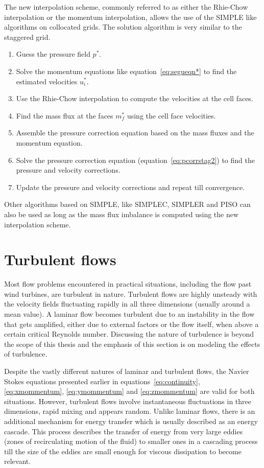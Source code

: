 The new interpolation scheme, commonly referred to as either the Rhie-Chow interpolation or the momentum interpolation, allows the use of the SIMPLE like algorithms on collocated grids. The solution algorithm is very similar to the staggered grid.
\begin{enumerate}
    \item Guess the pressure field $p^{\ast}$.
    \item Solve the momentum equations like equation~\ref{eq:segueqn*} to find the estimated velocities $u_i^{\ast}$.
    \item Use the Rhie-Chow interpolation to compute the velocities at the cell faces.
    \item Find the mass flux at the faces $m_f^{\ast}$ using the cell face velocities.
    \item Assemble the pressure correction equation based on the mass fluxes and the momentum equation.
    \item Solve the pressure correction equation (equation~\ref{eq:pcorrstag2}) to find the pressure and velocity corrections.
    \item Update the pressure and velocity corrections and repeat till convergence.
\end{enumerate}
Other algorithms based on SIMPLE, like SIMPLEC, SIMPLER and PISO can also be used as long as the mass flux imbalance is computed using the new interpolation scheme.
\section{Turbulent flows}
Most flow problems encountered in practical situations, including the flow past wind turbines, are turbulent in nature. Turbulent flows are highly unsteady with the velocity fields fluctuating rapidly in all three dimensions (usually around a mean value). A laminar flow becomes turbulent due to an instability in the flow that gets amplified, either due to external factors or the flow itself, when above a certain critical Reynolds number. Discussing the nature of turbulence is beyond the scope of this thesis and the emphasis of this section is on modeling the effects of turbulence.

Despite the vastly different natures of laminar and turbulent flows, the Navier Stokes equations presented earlier in equations~\ref{eq:continuity}, \ref{eq:xmommentum}, \ref{eq:ymommentum} and \ref{eq:zmommentum} are valid for both situations. However, turbulent flows involve instantaneous fluctuations in three dimensions, rapid mixing and appears random. Unlike laminar flows, there is an additional mechanism for energy transfer which is usually described as an energy cascade. This process describes the transfer of energy from very large eddies (zones of recirculating motion of the fluid) to smaller ones in a cascading process till the size of the eddies are small enough for viscous dissipation to become relevant.

